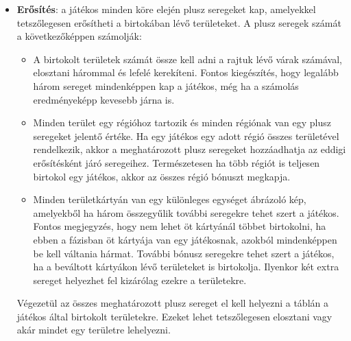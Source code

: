 \documentclass[
]{thesis-ekf}
\theoremstyle{definition}
\theoremstyle{remark}
\begin{document}
\begin{itemize}
	\item \textbf{Erősítés}: a játékos minden köre elején plusz seregeket kap, amelyekkel tetszőlegesen erősítheti a birtokában lévő területeket. A plusz seregek számát a következőképpen számolják:
	\begin{itemize}
		\item A birtokolt területek számát össze kell adni a rajtuk lévő várak számával, elosztani hárommal és lefelé kerekíteni. Fontos kiegészítés, hogy legalább három sereget mindenképpen kap a játékos, még ha a számolás eredményeképp kevesebb járna is.
		\item Minden terület egy régióhoz tartozik és minden régiónak van egy plusz seregeket jelentő értéke. Ha egy játékos egy adott régió összes területével rendelkezik, akkor a meghatározott plusz seregeket hozzáadhatja az eddigi erősítésként járó seregeihez. Természetesen ha több régiót is teljesen birtokol egy játékos, akkor az összes régió bónuszt megkapja.
		\item Minden területkártyán van egy különleges egységet ábrázoló kép, amelyekből ha három összegyűlik további seregekre tehet szert a játékos. Fontos megjegyzés, hogy nem lehet öt kártyánál többet birtokolni, ha ebben a fázisban öt kártyája van egy játékosnak, azokból mindenképpen be kell váltania hármat. További bónusz seregekre tehet szert a játékos, ha a beváltott kártyákon lévő területeket is birtokolja. Ilyenkor két extra sereget helyezhet fel kizárólag ezekre a területekre.
	\end{itemize}
	Végezetül az összes meghatározott plusz sereget el kell helyezni a táblán a játékos által birtokolt területekre. Ezeket lehet tetszőlegesen elosztani vagy akár mindet egy területre lehelyezni.

\end{itemize}
\end{document}
